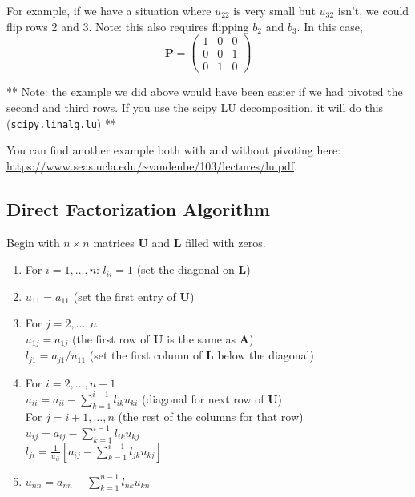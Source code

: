 \documentclass[12pt, answers]{exam}
\newcommand{\ve}[1]{\ensuremath{\mathbf{#1}}}
\begin{document}
For example, if we have a situation where $u_{22}$ is very small but $u_{32}$ isn't, we could flip rows 2 and 3. Note: this also requires flipping $b_2$ and $b_3$. In this case, 
\[\ve{P} = \begin{pmatrix}
  1 & 0 & 0 \\
  0 & 0 & 1 \\
  0 & 1 & 0
\end{pmatrix} \]

** Note: the example we did above would have been easier if we had pivoted the second and third rows. If you use the scipy LU decomposition, it will do this (\texttt{scipy.linalg.lu}) **


You can find another example both with and without pivoting here: \url{https://www.seas.ucla.edu/~vandenbe/103/lectures/lu.pdf}.

\subsection*{Direct Factorization Algorithm}
Begin with $n \times n$ matrices $\ve{U}$ and $\ve{L}$ filled with zeros.
%
\begin{enumerate}
\item For $i = 1, \dots, n$: $l_{ii} = 1$ (set the diagonal on $\ve{L}$)
\item $u_{11} = a_{11}$ (set the first entry of $\ve{U}$)

\item For $j = 2, \dots, n$\\
  \hspace*{1 em} $u_{1j} = a_{1j}$ (the first row of $\ve{U}$ is the same as $\ve{A}$)\\
  \hspace*{1 em} $l_{j1} = a_{j1}/u_{11}$ (set the first column of $\ve{L}$ below the diagonal)
 
\item For $i = 2, \dots, n-1$\\
  \hspace*{1 em} $u_{ii} = a_{ii} - \sum_{k=1}^{i-1} l_{ik} u_{ki}$ (diagonal for next row of $\ve{U}$)\\
  \hspace*{1 em} For $j = i+1, \dots, n$ (the rest of the columns for that row)\\   
    \hspace*{3 em} $u_{ij} = a_{ij} - \sum_{k=1}^{i-1} l_{ik} u_{kj}$\\
    \hspace*{3 em} $l_{ji} = \frac{1}{u_{ii}} [a_{ij} - \sum_{k=1}^{i-1} l_{jk} u_{kj}]$
    
\item $u_{nn} = a_{nn} - \sum_{k=1}^{n-1} l_{nk} u_{kn}$
\end{enumerate}
\end{document}
